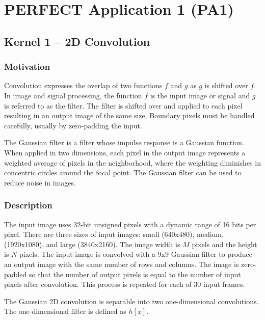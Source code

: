 \documentclass{report}
\begin{document}
\chapter{PERFECT Application 1 (PA1)}


\section{Kernel 1 -- 2D Convolution}
\label{sec:app1:2dconv}

\subsection{Motivation}

Convolution expresses the overlap of two functions $f$ and $g$ as $g$ is shifted
over $f$.  In image and signal processing, the function $f$ is the input image
or signal and $g$ is referred to as the filter.  The filter is shifted over and
applied to each pixel resulting in an output image of the same size.  Boundary
pixels must be handled carefully, usually by zero-padding the input.

The Gaussian filter is a filter whose impulse response is a Gaussian function.
When applied in two dimensions, each pixel in the output image represents a
weighted average of pixels in the neighborhood, where the weighting diminishes
in concentric circles around the focal point.  The Gaussian filter can be used
to reduce noise in images.

\subsection{Description}

The input image uses 32-bit unsigned pixels with a dynamic range of 16 bits per
pixel.
There are three sizes of input images: small (640x480), medium, (1920x1080),
and large (3840x2160).
The image width is $M$ pixels and the height is $N$ pixels.
The input image is convolved with a 9x9 Gaussian filter to produce
an output image with the same number of rows and columns.
The image is zero-padded so that the number of output pixels is equal to the
number of input pixels after convolution.
This process is repeated for each of 30 input frames.

The Gaussian 2D convolution is separable into two one-dimensional convolutions.
The one-dimensional filter is defined as $h[x]$.
\end{document}
